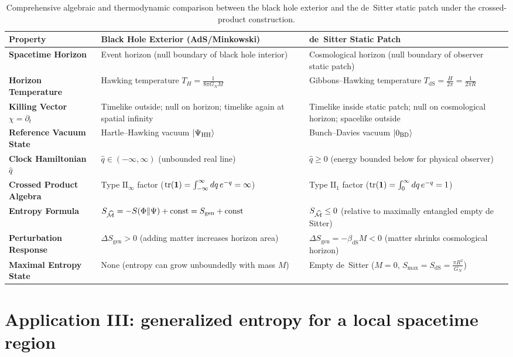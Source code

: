\begin{table}[htbp]
\centering
\small
\renewcommand{\arraystretch}{1.3}
\begin{tabularx}{\textwidth}{>{\bfseries\color{navyhead}}l >{\raggedright\arraybackslash}X >{\raggedright\arraybackslash}X}
\toprule
Property & Black Hole Exterior (AdS/Minkowski) & de~Sitter Static Patch \\
\midrule
Spacetime Horizon & Event horizon (null boundary of black hole interior) & Cosmological horizon (null boundary of observer static patch) \\
Horizon Temperature & Hawking temperature $T_H = \frac{1}{8\pi G_N M}$ & Gibbons--Hawking temperature $T_{\text{dS}} = \frac{H}{2\pi} = \frac{1}{2\pi R}$ \\
Killing Vector $\chi = \partial_t$ & Timelike outside; null on horizon; timelike again at spatial infinity & Timelike inside static patch; null on cosmological horizon; spacelike outside \\
Reference Vacuum State & Hartle--Hawking vacuum $\ket{\Psi_{\text{HH}}}$ & Bunch--Davies vacuum $\ket{0_{\text{BD}}}$ \\
Clock Hamiltonian $\hat q$ & $\hat q \in (-\infty, \infty)$ (unbounded real line) & $\hat q \ge 0$ (energy bounded below for physical observer) \\
Crossed Product Algebra & Type $\mathrm{II}_\infty$ factor ($\operatorname{tr}(\mathbf{1}) = \int_{-\infty}^\infty dq\,e^{-q} = \infty$) & Type $\mathrm{II}_1$ factor ($\operatorname{tr}(\mathbf{1}) = \int_0^\infty dq\,e^{-q} = 1$) \\
Entropy Formula & $S_{\widehat{\mathcal{M}}} = -S(\Phi\|\Psi) + \text{const} = S_{\text{gen}} + \text{const}$ & $S_{\widehat{\mathcal{M}}} \le 0$ (relative to maximally entangled empty de Sitter) \\
Perturbation Response & $\Delta S_{\text{gen}} > 0$ (adding matter increases horizon area) & $\Delta S_{\text{gen}} = -\beta_{\text{dS}} M < 0$ (matter shrinks cosmological horizon) \\
Maximal Entropy State & None (entropy can grow unboundedly with mass $M$) & Empty de~Sitter ($M = 0$, $S_{\text{max}} = S_{\text{dS}} = \frac{\pi R^2}{G_N}$) \\
\bottomrule
\end{tabularx}
\caption{Comprehensive algebraic and thermodynamic comparison between the black hole exterior and the de~Sitter static patch under the crossed-product construction.}
\label{tab:bh_vs_desitter}
\end{table}

\section{Application III: generalized entropy for a local spacetime region}

